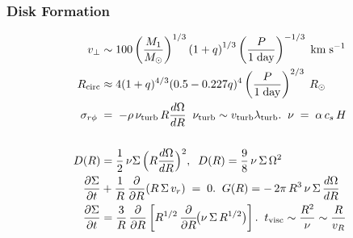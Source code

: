 \begin{multicols}{2}
\subsubsection*{Disk Formation}
\[
\begin{aligned}
        v_\perp &\sim 100\left(\frac{M_1}{M_\odot}\right)^{1/3}\left(1+q\right)^{1/3} \left(\frac{P}{\rm 1\; day}\right)^{-1/3}\;{\rm km\;s^{-1}}\\
    R_{\rm circ} &\approx 4(1+q)^{4/3}(0.5-0.227q)^4 \left(\frac{P}{\rm 1 \; day}\right)^{2/3} \;R_\odot\\
    \sigma_{r\phi} \;&=\; - \rho \,\nu_{\rm turb}\, R \frac{d\Omega}{dR}\;\;\nu_{\rm turb}\sim v_{\rm turb}\lambda_{\rm turb}.\;\;  \nu \;=\; \alpha \, c_s \, H\\\\
    D(R) &= \frac{1}{2}\,\nu \Sigma \,\Bigl(R \frac{d\Omega}{dR}\Bigr)^2,\;\;D(R) = \frac{9}{8}\,\nu\,\Sigma\,\Omega^2\\
    \frac{\partial \Sigma}{\partial t}
&+ \frac{1}{R}\,\frac{\partial}{\partial R}\!\left(R\,\Sigma\,v_r\right) \;=\; 0.\;\;
G(R) =-\,2\pi\,R^3\,\nu\,\Sigma\,\frac{d\Omega}{dR}\\
\frac{\partial \Sigma}{\partial t}
&= \frac{3}{R}\,\frac{\partial}{\partial R}
\left[
R^{1/2}\,\frac{\partial}{\partial R}\!\big(\nu\,\Sigma\,R^{1/2}\big)
\right].\;\;    t_{\rm visc} \sim \frac{R^2}{\nu} \sim \frac{R}{v_R}\\
\;
\end{aligned}
\]

\end{multicols}
